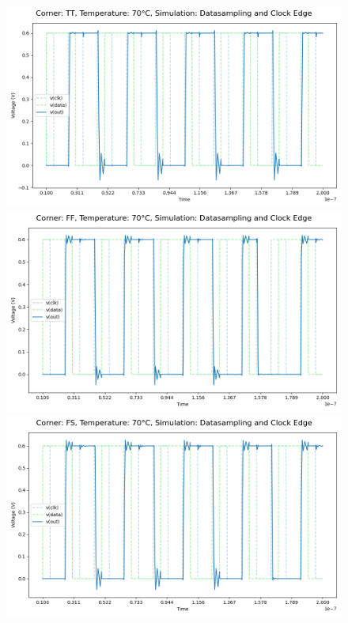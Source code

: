 \begin{figure}[H]
    \centering
    \includegraphics[height= 0.21\textheight]{figures/aimspice/0.600_0.1u_0.1u_0.3u_0.1u/functionality/TT70W1.png}
    \vspace{5pt}
    \includegraphics[height= 0.21\textheight]{figures/aimspice/0.600_0.1u_0.1u_0.3u_0.1u/functionality/FF70W1.png}
    \vspace{5pt}
    \includegraphics[height= 0.21\textheight]{figures/aimspice/0.600_0.1u_0.1u_0.3u_0.1u/functionality/FS70W1.png}

\end{figure}

